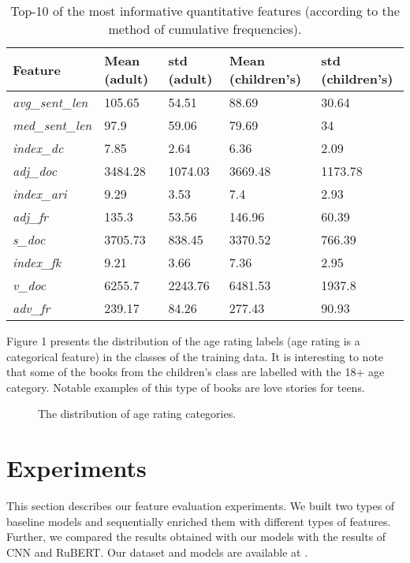 \documentclass[runningheads]{llncs}
\begin{document}
\begin{table}[]
\begin{center}
\caption{Top-10 of the most informative quantitative features (according to the method of cumulative frequencies).}\label{tab3}
\begin{tabular}{|l|l|l|l|l|}
\hline
\multicolumn{1}{|l|}{Feature} & \multicolumn{1}{|l|}{Mean (adult)} & \multicolumn{1}{|l|}{std (adult)} & \multicolumn{1}{|l|}{Mean (children's)} & \multicolumn{1}{|l|}{std (children's)} \\
\hline
\textit{avg\_sent\_len} & 105.65 & 54.51 & 88.69 & 30.64 \\
\textit{med\_sent\_len} & 97.9 & 59.06 & 79.69 & 34 \\
\textit{index\_dc} & 7.85 & 2.64 & 6.36 & 2.09 \\
\textit{adj\_doc} & 3484.28 & 1074.03 & 3669.48 & 1173.78 \\
\textit{index\_ari} & 9.29 & 3.53 & 7.4 & 2.93 \\
\textit{adj\_fr} & 135.3 & 53.56 & 146.96 & 60.39 \\
\textit{s\_doc} & 3705.73 & 838.45 & 3370.52 & 766.39 \\
\textit{index\_fk} & 9.21 & 3.66 & 7.36 & 2.95 \\
\textit{v\_doc} & 6255.7 & 2243.76 & 6481.53 & 1937.8 \\
\textit{adv\_fr} & 239.17 & 84.26 & 277.43 & 90.93 \\
\hline
\end{tabular}
\end{center}
\end{table}

Figure 1 presents the distribution of the age rating labels (age rating is a categorical feature) in the classes of the training data. It is interesting to note that some of the books from the children's class are labelled with the 18+ age category. Notable examples of this type of books are love stories for teens.

\begin{figure}[h]
\caption{The distribution of age rating categories.}
\label{fig:image}
\end{figure}

\section{Experiments}

This section describes our feature evaluation experiments. We built two types of baseline models and sequentially enriched them with different types of features. Further, we compared the results obtained with our models with the results of CNN and RuBERT. Our dataset and models are available at \cite{github}.
\end{document}
